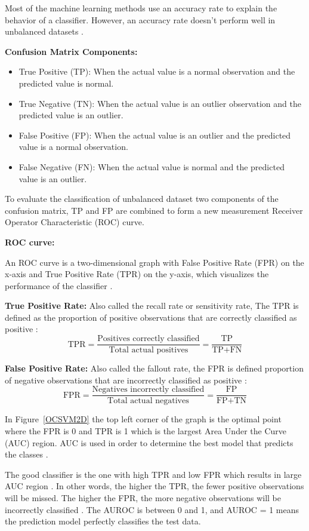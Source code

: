 Most of the machine learning methods use an accuracy rate to explain the behavior of a classifier. However, an accuracy rate doesn't perform well in unbalanced datasets \citep{ROC}.

\textbf{Confusion Matrix Components:}
\begin{itemize}
\item True Positive (TP): When the actual value is a normal observation and the predicted value is normal.
\item True Negative (TN): When the actual value is an outlier observation and the predicted value is an outlier.
\item False Positive (FP): When the actual value is an outlier and the predicted value is a normal observation.
\item False Negative (FN): When the actual value is normal and the predicted value is an outlier.
\end{itemize}
To evaluate the classification of unbalanced dataset two components of the confusion matrix, TP and FP are combined to form a new measurement Receiver Operator Characteristic (ROC) curve.

\textbf{ROC curve:}

An ROC curve is a two-dimensional graph with False Positive Rate (FPR) on the x-axis and True Positive Rate (TPR) on the y-axis, which visualizes the performance of the classifier \citep{ROC}.

\textbf{True Positive Rate:}
Also called the recall rate or sensitivity rate, The TPR is defined as the proportion of positive observations that are correctly classified as positive \citep{AUROC}:
$$
\text{TPR} = \frac{\text{Positives correctly classified}}{\text{Total actual positives}} = \frac{\text{TP}}{\text{TP+FN}}
$$

\textbf{False Positive Rate:}
Also called the fallout rate, the FPR is defined proportion of negative observations that are incorrectly classified as positive \citep{AUROC}:
$$
\text{FPR} = \frac{\text{Negatives incorrectly classified}}{\text{Total actual negatives}} = \frac{\text{FP}}{\text{FP+TN}}
$$

In Figure~\ref{OCSVM2D} the top left corner of the graph is the optimal point where the FPR is 0 and TPR is 1 which is the largest Area Under the Curve (AUC) region. AUC is used in order to determine the best model that predicts the classes \citep{AUROC}. 

The good classifier is the one with high TPR and low FPR which results in large AUC region \citep{AUC}. In other words, the higher the TPR, the fewer positive observations will be missed. The higher the FPR, the more negative observations will be incorrectly classified \citep{AUROC}.
The AUROC is between 0 and 1, and AUROC = 1 means the prediction model perfectly classifies the test data.

